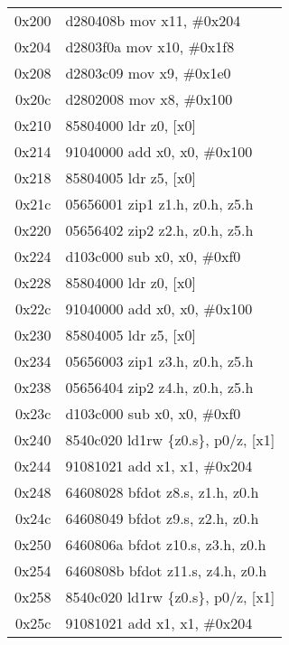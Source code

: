 \documentclass[11pt,a4paper]{article}
\begin{document}
\begin{longtable}{|r|l|}
\rowcolor{control} 0x200 & d280408b \quad mov x11, \#0x204 \\
\rowcolor{control} 0x204 & d2803f0a \quad mov x10, \#0x1f8 \\
\rowcolor{control} 0x208 & d2803c09 \quad mov x9, \#0x1e0 \\
\rowcolor{control} 0x20c & d2802008 \quad mov x8, \#0x100 \\

\rowcolor{matrixload} 0x210 & 85804000 \quad ldr z0, [x0] \\
\rowcolor{address} 0x214 & 91040000 \quad add x0, x0, \#0x100 \\
\rowcolor{matrixload} 0x218 & 85804005 \quad ldr z5, [x0] \\
\rowcolor{matrixload} 0x21c & 05656001 \quad zip1 z1.h, z0.h, z5.h \\
\rowcolor{matrixload} 0x220 & 05656402 \quad zip2 z2.h, z0.h, z5.h \\
\rowcolor{address} 0x224 & d103c000 \quad sub x0, x0, \#0xf0 \\
\rowcolor{matrixload} 0x228 & 85804000 \quad ldr z0, [x0] \\
\rowcolor{address} 0x22c & 91040000 \quad add x0, x0, \#0x100 \\
\rowcolor{matrixload} 0x230 & 85804005 \quad ldr z5, [x0] \\
\rowcolor{matrixload} 0x234 & 05656003 \quad zip1 z3.h, z0.h, z5.h \\
\rowcolor{matrixload} 0x238 & 05656404 \quad zip2 z4.h, z0.h, z5.h \\
\rowcolor{address} 0x23c & d103c000 \quad sub x0, x0, \#0xf0 \\
\rowcolor{matrixload} 0x240 & 8540c020 \quad ld1rw \{z0.s\}, p0/z, [x1] \\
\rowcolor{address} 0x244 & 91081021 \quad add x1, x1, \#0x204 \\
\rowcolor{computation} 0x248 & 64608028 \quad bfdot z8.s, z1.h, z0.h \\
\rowcolor{computation} 0x24c & 64608049 \quad bfdot z9.s, z2.h, z0.h \\
\rowcolor{computation} 0x250 & 6460806a \quad bfdot z10.s, z3.h, z0.h \\
\rowcolor{computation} 0x254 & 6460808b \quad bfdot z11.s, z4.h, z0.h \\
\rowcolor{matrixload} 0x258 & 8540c020 \quad ld1rw \{z0.s\}, p0/z, [x1] \\
\rowcolor{address} 0x25c & 91081021 \quad add x1, x1, \#0x204 \\

\end{longtable}
\end{document}
